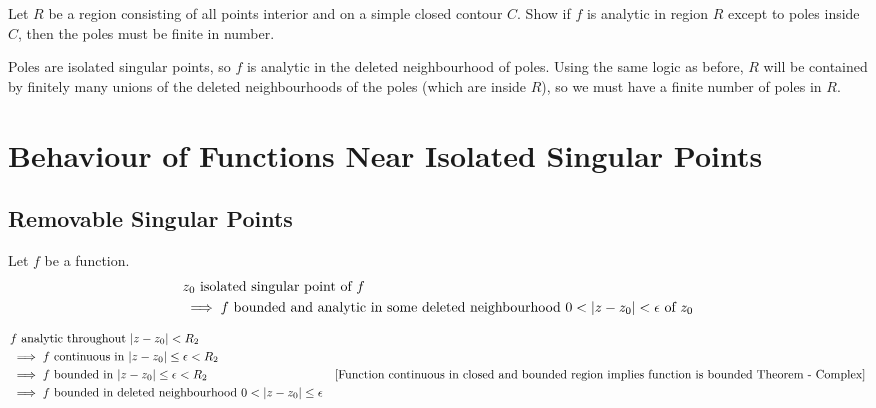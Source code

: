 \documentclass[12pt, english]{book}
\makeatletter
\renewenvironment{proof}[1][\proofname]{\par
	\pushQED{\qed}%
	\normalfont \topsep6\p@\@plus6\p@\relax
	\list{}{%
		\settowidth{\leftmargin}{\itshape\proofname:\hskip\labelsep}%
		\setlength{\labelwidth}{0pt}%
		\setlength{\itemindent}{-\leftmargin}%
	}%
	\item[\hskip\labelsep\itshape#1\@addpunct{:}]\ignorespaces
	}{ \popQED\endlist\@endpefalse}
\makeatother
\begin{document}
	\begin{example}
		\label{Isolated zeros implies finite poles in analytic region Example - Complex}
		Let \(R\) be a region consisting of all points interior and on a simple closed contour \(C\). Show if \(f\) is analytic in region \(R\) except to poles inside \(C\), then the poles must be finite in number. 
	\end{example}
	\begin{proof}
		{\color{Grey}
		Poles are isolated singular points, so \(f\) is analytic in the deleted neighbourhood of poles. Using the same logic as before, \(R\) will be contained by finitely many unions of the deleted neighbourhoods of the poles (which are inside \(R\)), so we must have a finite number of poles in \(R\).
		}
	\end{proof}


	\section{Behaviour of Functions Near Isolated Singular Points} \label{Behaviour of Functions Near Isolated Singular Points Section - Complex}
	
	\subsection{Removable Singular Points}
	
	\begin{theorem}
		Let \(f\) be a function.
		\begin{align*}
			&z_0 \text{ isolated singular point of } f \\
			&\implies f \text{ bounded and analytic in some deleted neighbourhood } 0<\abs{z-z_0}<\epsilon \text{ of } z_0
		\end{align*}
	\end{theorem}
	\begin{proof}
		\begin{align*}
			&f \text{ analytic throughout } \abs{z-z_0}<R_2 \\
			&\implies f \text{ continuous in } \abs{z-z_0}\leq\epsilon<R_2 \\
			&\implies f \text{ bounded in } \abs{z-z_0}\leq\epsilon<R_2 
				&\text{\Cref{Function continuous in closed and bounded region implies function is bounded Theorem - Complex}}\\
			&\implies f \text{ bounded in deleted neighbourhood } 0<\abs{z-z_0}\leq\epsilon
		\end{align*}
	\end{proof}
\end{document}
